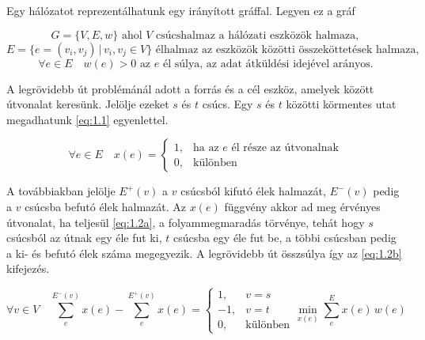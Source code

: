 \documentclass[a4paper,oneside]{article}
\newcommand{\inedge}[1]{E^-(#1)}
\newcommand{\outedge}[1]{E^+(#1)}
\begin{document}
Egy hálózatot reprezentálhatunk egy irányított gráffal. Legyen ez a gráf

$$G = \lbrace V, E, w \rbrace \text{ ahol } V \text{ csúcshalmaz a hálózati eszközök halmaza},$$
$$E = \lbrace e = (v_i, v_j) \, \vert \, v_i, v_j \in V \rbrace \text{ élhalmaz az eszközök közötti összeköttetések halmaza},$$
$$\forall e \in E \quad w(e) > 0 \text{ az $e$ él súlya, az adat átküldési idejével arányos}.$$

A legrövidebb út problémánál adott a forrás és a cél eszköz, amelyek között útvonalat keresünk.
Jelölje ezeket $s$ és $t$ csúcs.
Egy $s$ és $t$ közötti körmentes utat megadhatunk \eqref{eq:1.1} egyenlettel.

\begin{equation}
  \forall e \in E \quad x(e) = \begin{cases}
    1, & \text{ha az $e$ él része az útvonalnak}\\
    0, & \text{különben}
  \end{cases} \label{eq:1.1}
\end{equation}

A továbbiakban jelölje $\outedge{v}$ a $v$ csúcsból kifutó élek halmazát,
$\inedge{v}$ pedig a $v$ csúcsba befutó élek halmazát.
Az $x(e)$ függvény akkor ad meg érvényes útvonalat, ha teljesül \eqref{eq:1.2a}, a folyammegmaradás törvénye,
tehát hogy $s$ csúcsból az útnak egy éle fut ki, $t$ csúcsba egy éle fut be,
a többi csúcsban pedig a ki- és befutó élek száma megegyezik.
A legrövidebb út összsúlya így az \eqref{eq:1.2b} kifejezés.

\begin{subequations}
  \begin{equation}
    \forall v \in V \quad \sum_{e}^{\inedge{v}}x(e) - \sum_{e}^{\outedge{v}}x(e) = \begin{cases}
      1, & v = s \\
      -1, & v = t\\
      0, & \text{különben}
    \end{cases} \label{eq:1.2a}
  \end{equation}
  \begin{equation}
    \min_{x(e)} \sum_{e}^{E} x(e) \, w(e) \label{eq:1.2b}
  \end{equation}
\end{subequations}
\end{document}
